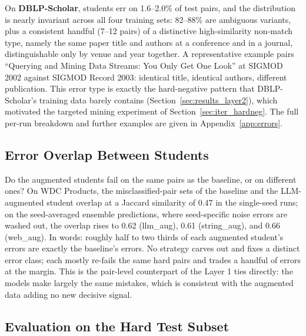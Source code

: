 \documentclass[a4paper,oneside,bibliography=totoc]{scrbook}
\begin{document}
On \textbf{DBLP-Scholar}, students err on 1.6--2.0\% of test pairs, and the distribution is nearly invariant across all four training sets: 82--88\% are ambiguous variants, plus a consistent handful (7--12 pairs) of a distinctive high-similarity non-match type, namely the same paper title and authors at a conference and in a journal, distinguishable only by venue and year together. A representative example pairs ``Querying and Mining Data Streams: You Only Get One Look'' at SIGMOD 2002 against SIGMOD Record 2003: identical title, identical authors, different publication. This error type is exactly the hard-negative pattern that DBLP-Scholar's training data barely contains (Section~\ref{sec:results_layer2}), which motivated the targeted mining experiment of Section~\ref{sec:iter_hardneg}. The full per-run breakdown and further examples are given in Appendix~\ref{app:errors}.

\subsection{Error Overlap Between Students}
\label{sec:results_overlap}

Do the augmented students fail on the same pairs as the baseline, or on different ones? On WDC Products, the misclassified-pair sets of the baseline and the LLM-augmented student overlap at a Jaccard similarity of 0.47 in the single-seed runs; on the seed-averaged ensemble predictions, where seed-specific noise errors are washed out, the overlap rises to 0.62 (llm\_aug), 0.61 (string\_aug), and 0.66 (web\_aug). In words: roughly half to two thirds of each augmented student's errors are exactly the baseline's errors. No strategy carves out and fixes a distinct error class; each mostly re-fails the same hard pairs and trades a handful of errors at the margin. This is the pair-level counterpart of the Layer 1 ties directly: the models make largely the same mistakes, which is consistent with the augmented data adding no new decisive signal.

\subsection{Evaluation on the Hard Test Subset}
\label{sec:results_hardsubset}
\end{document}

